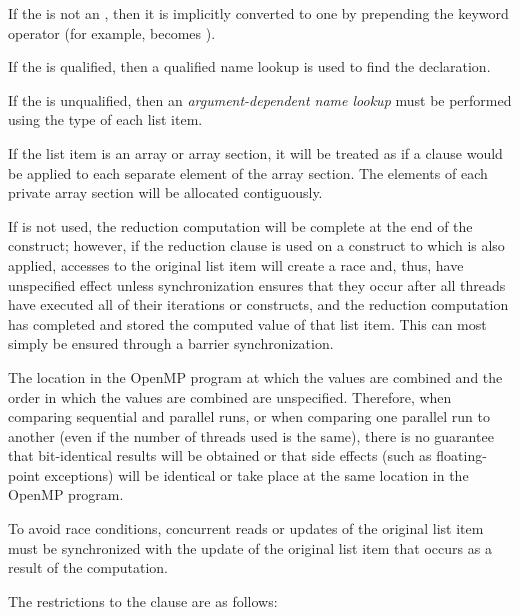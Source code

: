 If the  is not an , then it is implicitly converted to one by 
prepending the keyword operator (for example, \code{+} becomes ).

If the  is qualified, then a qualified name lookup is used to find the 
declaration.

If the  is unqualified, then an \emph{argument-dependent name lookup} must 
be performed using the type of each list item.
\cppspecificend

If the list item is an array or array section, it will be treated as
if a  clause would be applied to each separate element
of the array section. The elements of each private array section will
be allocated contiguously.

If  is not used, the reduction computation will be complete at the end of the 
construct; however, if the reduction clause is used on a construct to which  is 
also applied, accesses to the original list item will create a race and, thus, have 
unspecified effect unless synchronization ensures that they occur after all threads have 
executed all of their iterations or  constructs, and the reduction computation 
has completed and stored the computed value of that list item. This can most simply be 
ensured through a barrier synchronization. 

The location in the OpenMP program at which the values are combined and the order in 
which the values are combined are unspecified. Therefore, when comparing sequential 
and parallel runs, or when comparing one parallel run to another (even if the number of 
threads used is the same), there is no guarantee that bit-identical results will be obtained 
or that side effects (such as floating-point exceptions) will be identical or take place at 
the same location in the OpenMP program.

To avoid race conditions, concurrent reads or updates of the original list item must be 
synchronized with the update of the original list item that occurs as a result of the 
 computation.

\restrictions
The restrictions to the  clause are as follows:

